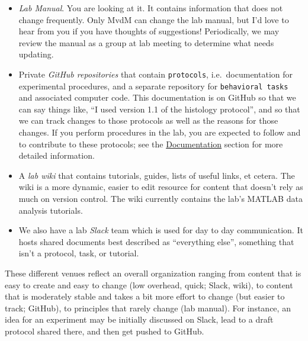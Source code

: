 \documentclass{tufte-book}
\newcommand{\doccls}[1]{\texttt{#1}}%
\begin{document}
\begin{itemize}
\item{{\it Lab Manual}. You are looking at it. It contains information
  that does not change frequently. Only MvdM can change the lab
  manual, but I'd love to hear from you if you have thoughts of
  suggestions! Periodically, we may review the manual as a group at
  lab meeting to determine what needs updating.}
\item{Private {\it GitHub
    repositories} that contain \doccls{protocols},
  i.e.\ documentation for experimental procedures, and a separate repository for
  \doccls{behavioral tasks} and associated computer
  code. This documentation is on GitHub
  so that we can say things like, ``I used version 1.1 of the
  histology protocol'', and so that we can track changes to those
  protocols as well as the reasons for those changes. If you perform
  procedures in the lab, you are expected to follow and to contribute
  to these protocols; see the \href{sec:notes}{Documentation} section for
  more detailed information.}
\item{A {\it lab
    wiki} that
  contains tutorials, guides, lists of useful links, et cetera. The
  wiki is a more dynamic, easier to edit resource for content that
  doesn't rely as much on version control. The wiki currently contains
  the lab's MATLAB data analysis tutorials.}
\item{We also have a lab {\it Slack}
  team
  which is used for day to day communication. It hosts shared
  documents best described as ``everything else'', something that
  isn't a protocol, task, or tutorial.}
\end{itemize}

These different venues reflect an overall organization ranging from
content that is easy to create and easy to change (low overhead,
quick; Slack, wiki), to content that is moderately stable and takes a
bit more effort to change (but easier to track; GitHub), to principles
that rarely change (lab manual). For instance, an idea for an
experiment may be initially discussed on Slack, lead to a draft
protocol shared there, and then get pushed to GitHub. 
\end{document}
